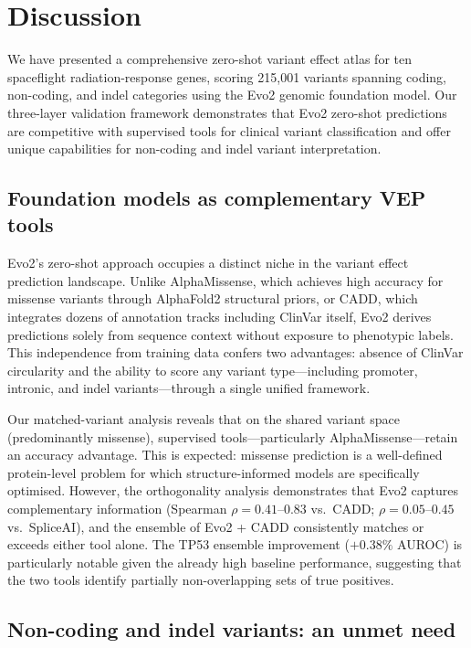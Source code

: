 \section{Discussion}
\label{sec:discussion}

We have presented a comprehensive zero-shot variant effect atlas for ten
spaceflight radiation-response genes, scoring 215,001 variants spanning coding,
non-coding, and indel categories using the Evo2 genomic foundation model. Our
three-layer validation framework demonstrates that Evo2 zero-shot predictions
are competitive with supervised tools for clinical variant classification and
offer unique capabilities for non-coding and indel variant interpretation.

\subsection*{Foundation models as complementary VEP tools}

Evo2's zero-shot approach occupies a distinct niche in the variant effect
prediction landscape. Unlike AlphaMissense, which achieves high accuracy for
missense variants through AlphaFold2 structural priors, or CADD, which
integrates dozens of annotation tracks including ClinVar itself, Evo2 derives
predictions solely from sequence context without exposure to phenotypic labels.
This independence from training data confers two advantages: absence of
ClinVar circularity and the ability to score any variant type---including
promoter, intronic, and indel variants---through a single unified framework.

Our matched-variant analysis reveals that on the shared variant space
(predominantly missense), supervised tools---particularly AlphaMissense---retain
an accuracy advantage. This is expected: missense prediction is a well-defined
protein-level problem for which structure-informed models are specifically
optimised. However, the orthogonality analysis demonstrates that Evo2 captures
complementary information (Spearman $\rho = 0.41$--$0.83$ vs.\ CADD;
$\rho = 0.05$--$0.45$ vs.\ SpliceAI), and the ensemble of Evo2 + CADD
consistently matches or exceeds either tool alone. The TP53 ensemble improvement
($+0.38\%$ AUROC) is particularly notable given the already high baseline
performance, suggesting that the two tools identify partially non-overlapping
sets of true positives.

\subsection*{Non-coding and indel variants: an unmet need}

